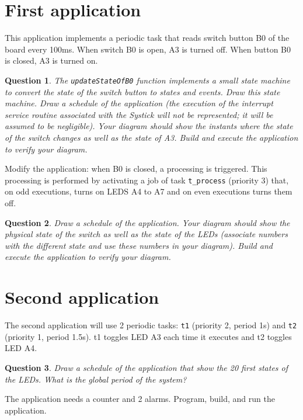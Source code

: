 \documentclass[11pt]{report}
\newtheorem{ex}{Question}
\begin{document}
\section{First application}

This application implements a periodic task that reads switch button B0 of the board every 100ms.
When switch B0 is open, A3 is turned off.
When button B0 is closed, A3 is turned on.

\begin{ex}
    The \texttt{updateStateOfB0} function implements a small state machine to convert the state of the switch button to states and events.
    Draw this state machine.
    Draw a schedule of the application (the execution of the interrupt service routine associated with the Systick will not be represented; it will be assumed to be negligible).
    Your diagram should show the instants where the state of the switch changes as well as the state of A3.
    Build and execute the application to verify your diagram.
\end{ex}

Modify the application: when B0 is closed, a processing is triggered.
This processing is performed by activating a job of task \texttt{t_process} (priority 3) that, on odd executions, turns on LEDS A4 to A7 and on even executions turns them off.
\begin{ex}
Draw a schedule of the application.
Your diagram should show the physical state of the switch as well as the state of the LEDs (associate numbers with the different state and use these numbers in your diagram).
Build and execute the application to verify your diagram.
\end{ex}


\section{Second application}

The second application will use 2 periodic tasks: \texttt{t1} (priority 2, period 1s) and \texttt{t2} (priority 1, period 1.5s). t1 toggles LED A3 each time it executes and t2 toggles LED A4.

\begin{ex}
    Draw a schedule of the application that show the 20 first states of the LEDs.
    What is the global period of the system?
\end{ex}

The application needs a counter and 2 alarms. Program, build, and run the application.
\end{document}
